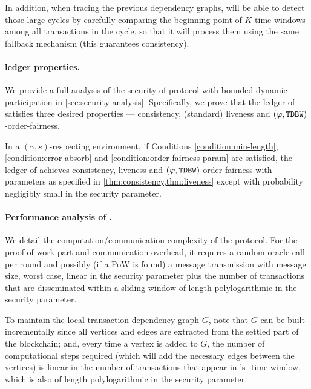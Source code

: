 In addition, when tracing the previous dependency graphs, \Taxis will be able to detect those large cycles by carefully comparing the beginning point of $K$-time windows among all transactions in the cycle, so that it will process them using the same fallback mechanism (this guarantees consistency).



\paragraph{\Taxis ledger properties.}
%
We provide a full analysis of the security of \Taxis protocol with bounded dynamic participation in \cref{sec:security-analysis}.
%
Specifically, we prove that the ledger \ledger of \Taxis satisfies three desired properties --- consistency, (standard) liveness and $(\varphi, \mathtt{TDBW})$-order-fairness.

\begin{theorem}
    In a $(\gamma, s)$-respecting environment, if Conditions \eqref{condition:min-length}, \eqref{condition:error-absorb} and \eqref{condition:order-fairness-param} are satisfied, the ledger \ledger of \Taxis achieves consistency, liveness and $(\varphi, \mathtt{TDBW})$-order-fairness with parameters as specified in \cref{thm:consistency,thm:liveness} except with probability negligibly small in the security parameter.
\end{theorem}

\paragraph{Performance analysis of \Taxis.}
%
We detail the computation/communication complexity of the \Taxis protocol.
%
For the proof of work part and communication overhead, it requires a random oracle call per round and possibly (if a PoW is found) a message transmission with message size, worst case, linear in the security parameter plus the number of transactions that are disseminated within a sliding window of length polylogarithmic in the security parameter.

To maintain the local transaction dependency graph $G$, note that $G$ can be
built incrementally since all vertices and edges are extracted from the settled
part of the blockchain; and, every time a vertex \tx is added to $G$, the number
of computational steps required (which will add the necessary edges between the
vertices) is linear in the number of transactions that appear in \tx's
\PBWindowLen-time-window, which is also of length polylogarithmic in the
security parameter.

